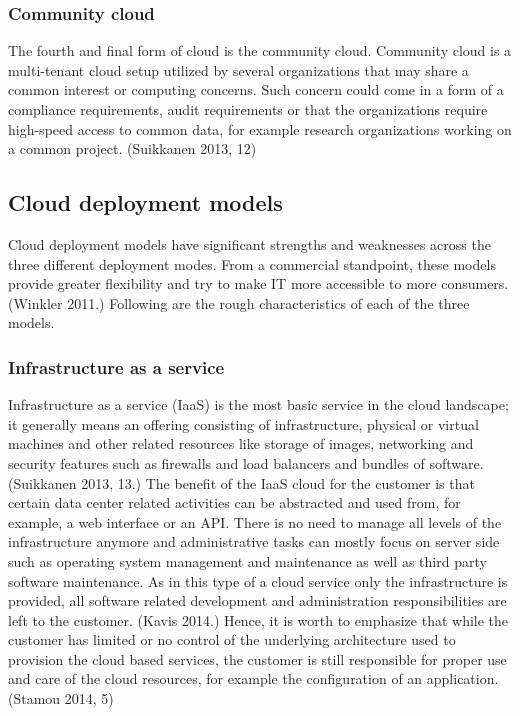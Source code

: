 \documentclass{article}
\begin{document}
\subsubsection{Community cloud}
The fourth and final form of cloud is the community cloud. Community cloud is a multi-tenant cloud setup utilized by several organizations that may share a common interest or computing concerns. Such concern could come in a form of a compliance requirements, audit requirements or that the organizations require high-speed access to common data, for example research organizations working on a common project. (Suikkanen 2013, 12)
\subsection{Cloud deployment models}
Cloud deployment models have significant strengths and weaknesses across the three different deployment modes. From a commercial standpoint, these models provide greater flexibility and try to make IT more accessible to more consumers. (Winkler 2011.) Following are the rough characteristics of each of the three models.
\subsubsection{Infrastructure as a service}
Infrastructure as a service (IaaS) is the most basic service in the cloud landscape; it generally means an offering consisting of infrastructure, physical or virtual machines and other related resources like storage of images, networking and security features such as firewalls and load balancers and bundles of software. (Suikkanen 2013, 13.)
The benefit of the IaaS cloud for the customer is that certain data center related activities can be abstracted and used from, for example, a web interface or an API. There is no need to manage all levels of the infrastructure anymore and administrative tasks can mostly focus on server side such as operating system management and maintenance as well as third party software maintenance.
As in this type of a cloud service only the infrastructure is provided, all software related development and administration responsibilities are left to the customer. (Kavis 2014.)
Hence, it is worth to emphasize that while the customer has limited or no control of the underlying architecture used to provision the cloud based services, the customer is still responsible for proper use and care of the cloud resources, for example the configuration of an application. (Stamou 2014, 5)
\end{document}

